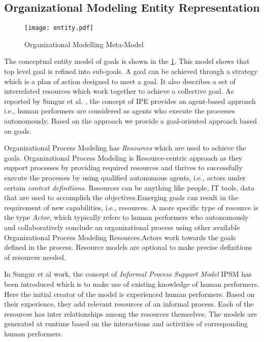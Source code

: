 \subsection{Organizational Modeling Entity Representation}

\begin{figure}
	\centering
	\texttt{[image: entity.pdf]}
	\caption{Organizational Modelling Meta-Model}
	\label{fig:metamodel}
\end{figure}

\hspace{4ex} The conceptual entity model of goals is shown in the \ref{fig:metamodel}. This model shows that top level goal is refined into sub-goals. A goal can be achieved through a strategy which is a plan of action designed to meet a goal. It also describes a set of interrelated resources which work together to achieve a collective goal. As reported by Sungur et al. \cite{Sungur2014a}, the concept of IPE provides an agent-based approach i.e., human performers are considered as agents who execute the processes autonomously. Based on the approach \cite{Sungur2014a} we provide a goal-oriented approach based on goals.

\hspace{4ex} Organizational Process Modeling  has \textit{Resources} which are used to achieve the goals. Organizational Process Modeling is Resource-centric approach as they support processes by providing required resources and thrives to successfully execute the processes by using qualified autonomous agents, i.e., actors under certain \textit{context definitions}.  Resources can be anything like people, IT tools, data that are used to accomplish the objectives.Emerging goals can result in the requirement of new capabilities, i.e., resources. A more specific type of resource is the type \textit{Actor}, which typically refers to human performers who autonomously and collaboratively conclude an organizational process using other available Organizational Process Modeling Resources.Actors work towards the goals defined in the process. Resource models are optional to make precise definitions of resources needed.

\hspace{4ex} In Sungur et al \cite{Sungur2014a} work, the concept of \textit{Informal Process Support Model} IPSM has been introduced which is to make use of existing knowledge of human performers. Here the initial creator of the model is experienced human performers. Based on their experience, they add relevant  resources of an informal process. Each of the resources has inter relationships among the resources themselves. The models are generated at runtime based on the interactions and activities of corresponding human performers. 

